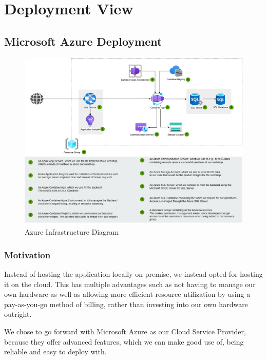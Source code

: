 \hypertarget{section-deployment-view}{%
\section{Deployment View}\label{section-deployment-view}}

\hypertarget{_infrastructure_level_1}{%
\subsection{Microsoft Azure Deployment}\label{_infrastructure_level_1}}

\begin{figure}[h]
  \centering
  \includegraphics[width=\textwidth]{images/azure_deployment_view.png}
  \caption{Azure Infrastructure Diagram}
\end{figure}

\subsubsection{Motivation}
Instead of hosting the application locally on-premise, we instead opted for hosting it on the cloud.
This has multiple advantages such as not having to manage our own hardware as well as allowing more efficient resource utilization
by using a pay-as-you-go method of billing, rather than investing into our own hardware outright.

We chose to go forward with Microsoft Azure as our Cloud Service Provider, because they offer advanced features,
which we can make good use of, 
being reliable and easy to deploy with.

